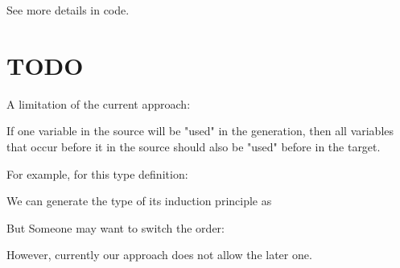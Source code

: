\documentclass[a4paper,UKenglish,cleveref, autoref, thm-restate]{lipics-v2021}
\begin{document}
See more details in code.


\section{TODO}

A limitation of the current approach:

If one variable in the source will be "used" in the generation, then all variables that occur before it in the source should also be "used" before in the target.

For example, for this type definition:

We can generate the type of its induction principle as


But Someone may want to switch the order:


However, currently our approach does not allow the later one.



\end{document}
